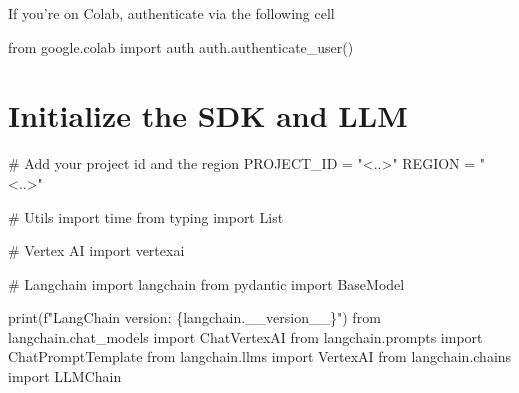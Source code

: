 \documentclass[
  letterpaper,
  DIV=11,
  numbers=noendperiod]{scrreprt}
\newenvironment{Shaded}{\begin{snugshade}}{\end{snugshade}}
\newcommand{\BuiltInTok}[1]{\textcolor[rgb]{0.00,0.23,0.31}{#1}}
\newcommand{\CommentTok}[1]{\textcolor[rgb]{0.37,0.37,0.37}{#1}}
\newcommand{\ImportTok}[1]{\textcolor[rgb]{0.00,0.46,0.62}{#1}}
\newcommand{\NormalTok}[1]{\textcolor[rgb]{0.00,0.23,0.31}{#1}}
\newcommand{\OperatorTok}[1]{\textcolor[rgb]{0.37,0.37,0.37}{#1}}
\newcommand{\SpecialCharTok}[1]{\textcolor[rgb]{0.37,0.37,0.37}{#1}}
\newcommand{\SpecialStringTok}[1]{\textcolor[rgb]{0.13,0.47,0.30}{#1}}
\newcommand{\StringTok}[1]{\textcolor[rgb]{0.13,0.47,0.30}{#1}}
\begin{document}
If you're on Colab, authenticate via the following cell

\begin{Shaded}
\begin{Highlighting}[]
\ImportTok{from}\NormalTok{ google.colab }\ImportTok{import}\NormalTok{ auth}
\NormalTok{auth.authenticate\_user()}
\end{Highlighting}
\end{Shaded}

\hypertarget{initialize-the-sdk-and-llm}{%
\chapter{Initialize the SDK and LLM}\label{initialize-the-sdk-and-llm}}

\begin{Shaded}
\begin{Highlighting}[]
\CommentTok{\# Add your project id and the region}
\NormalTok{PROJECT\_ID }\OperatorTok{=} \StringTok{"\textless{}..\textgreater{}"}
\NormalTok{REGION }\OperatorTok{=} \StringTok{"\textless{}..\textgreater{}"}
\end{Highlighting}
\end{Shaded}

\begin{Shaded}
\begin{Highlighting}[]
\CommentTok{\# Utils}
\ImportTok{import}\NormalTok{ time}
\ImportTok{from}\NormalTok{ typing }\ImportTok{import}\NormalTok{ List}

\CommentTok{\# Vertex AI}
\ImportTok{import}\NormalTok{ vertexai}

\CommentTok{\# Langchain}
\ImportTok{import}\NormalTok{ langchain}
\ImportTok{from}\NormalTok{ pydantic }\ImportTok{import}\NormalTok{ BaseModel}

\BuiltInTok{print}\NormalTok{(}\SpecialStringTok{f"LangChain version: }\SpecialCharTok{\{}\NormalTok{langchain}\SpecialCharTok{.}\NormalTok{\_\_version\_\_}\SpecialCharTok{\}}\SpecialStringTok{"}\NormalTok{)}
\ImportTok{from}\NormalTok{ langchain.chat\_models }\ImportTok{import}\NormalTok{ ChatVertexAI}
\ImportTok{from}\NormalTok{ langchain.prompts }\ImportTok{import}\NormalTok{ ChatPromptTemplate}
\ImportTok{from}\NormalTok{ langchain.llms }\ImportTok{import}\NormalTok{ VertexAI}
\ImportTok{from}\NormalTok{ langchain.chains }\ImportTok{import}\NormalTok{ LLMChain}
\end{Highlighting}
\end{Shaded}
\end{document}
